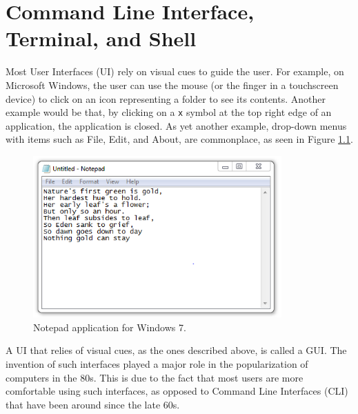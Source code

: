 \chapter{Command Line Interface, Terminal, and Shell}\label{ch:cli_terminal_shell}



Most User Interfaces (\acs{UI}) rely on visual cues to guide the user. For example, on Microsoft Windows, the user can use the mouse (or the finger in a touchscreen device) to click on an icon representing a folder to see its contents. Another example would be that, by clicking on a \texttt{x} symbol at the top right edge of an application, the application is closed. As yet another example, drop-down menus with items such as File, Edit, and About, are commonplace, as seen in Figure \ref{fig:ch1_notepad}.
\begin{figure}[!htbp]
  \centering
        \includegraphics[width=0.85\textwidth]{Images/Chapter1/notepad.png}
        \caption{Notepad application for Windows 7.}
        \label{fig:ch1_notepad}
\end{figure}

A \acs{UI} that relies of visual cues, as the ones described above, is called a \ac{GUI}. The invention of such interfaces played a major role in the popularization of computers in the 80s. This is due to the fact that most users are more comfortable using such interfaces, as opposed to Command Line Interfaces (\acs{CLI}) that have been around since the late 60s.

